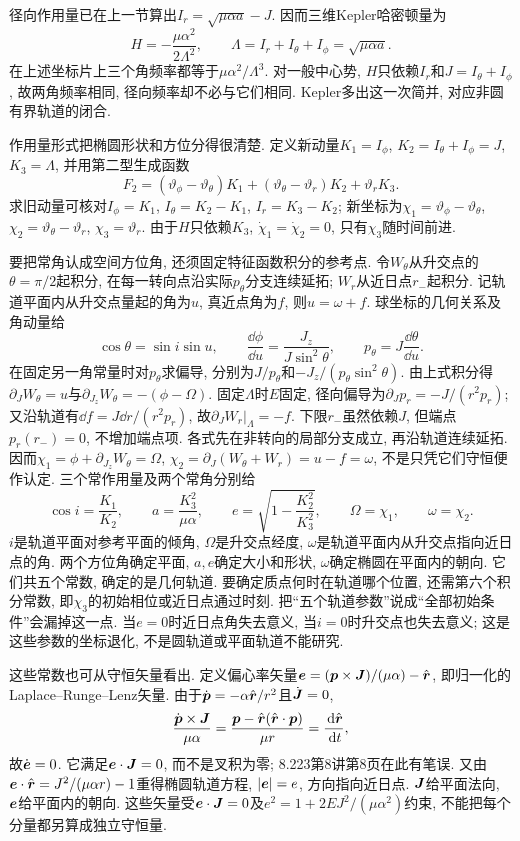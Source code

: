 径向作用量已在上一节算出$I_r=\sqrt{\mu\alpha a}-J$. 因而三维Kepler哈密顿量为
\[
H=-\frac{\mu\alpha^2}{2\Lambda^2},\qquad
\Lambda=I_r+I_\theta+I_\phi=\sqrt{\mu\alpha a}.
\]
在上述坐标片上三个角频率都等于$\mu\alpha^2/\Lambda^3$. 对一般中心势, $H$只依赖$I_r$和$J=I_\theta+I_\phi$, 故两角频率相同, 径向频率却不必与它们相同. Kepler多出这一次简并, 对应非圆有界轨道的闭合.

作用量形式把椭圆形状和方位分得很清楚. 定义新动量$K_1=I_\phi$, $K_2=I_\theta+I_\phi=J$, $K_3=\Lambda$, 并用第二型生成函数
\[
F_2=(\vartheta_\phi-\vartheta_\theta)K_1
+(\vartheta_\theta-\vartheta_r)K_2+\vartheta_rK_3.
\]
求旧动量可核对$I_\phi=K_1$, $I_\theta=K_2-K_1$, $I_r=K_3-K_2$; 新坐标为$\chi_1=\vartheta_\phi-\vartheta_\theta$, $\chi_2=\vartheta_\theta-\vartheta_r$, $\chi_3=\vartheta_r$. 由于$H$只依赖$K_3$, $\dot\chi_1=\dot\chi_2=0$, 只有$\chi_3$随时间前进.

要把常角认成空间方位角, 还须固定特征函数积分的参考点. 令$W_\theta$从升交点的$\theta=\pi/2$起积分, 在每一转向点沿实际$p_\theta$分支连续延拓; $W_r$从近日点$r_-$起积分. 记轨道平面内从升交点量起的角为$u$, 真近点角为$f$, 则$u=\omega+f$. 球坐标的几何关系及角动量给
\[
\cos\theta=\sin i\sin u,\qquad
\frac{\dd\phi}{\dd u}=\frac{J_z}{J\sin^2\theta},\qquad
p_\theta=J\frac{\dd\theta}{\dd u}.
\]
在固定另一角常量时对$p_\theta$求偏导, 分别为$J/p_\theta$和$-J_z/(p_\theta\sin^2\theta)$. 由上式积分得$\partial_JW_\theta=u$与$\partial_{J_z}W_\theta=-(\phi-\Omega)$. 固定$\Lambda$时$E$固定, 径向偏导为$\partial_Jp_r=-J/(r^2p_r)$; 又沿轨道有$\dd f=J\dd r/(r^2p_r)$, 故$\partial_JW_r|_\Lambda=-f$. 下限$r_-$虽然依赖$J$, 但端点$p_r(r_-)=0$, 不增加端点项. 各式先在非转向的局部分支成立, 再沿轨道连续延拓. 因而$\chi_1=\phi+\partial_{J_z}W_\theta=\Omega$, $\chi_2=\partial_J(W_\theta+W_r)=u-f=\omega$, 不是只凭它们守恒便作认定. 三个常作用量及两个常角分别给
\[
\cos i=\frac{K_1}{K_2},\qquad
a=\frac{K_3^2}{\mu\alpha},\qquad
e=\sqrt{1-\frac{K_2^2}{K_3^2}},\qquad
\Omega=\chi_1,\qquad \omega=\chi_2.
\]
$i$是轨道平面对参考平面的倾角, $\Omega$是升交点经度, $\omega$是轨道平面内从升交点指向近日点的角. 两个方位角确定平面, $a,e$确定大小和形状, $\omega$确定椭圆在平面内的朝向. 它们共五个常数, 确定的是几何轨道. 要确定质点何时在轨道哪个位置, 还需第六个积分常数, 即$\chi_3$的初始相位或近日点通过时刻. 把“五个轨道参数”说成“全部初始条件”会漏掉这一点. 当$e=0$时近日点角失去意义, 当$i=0$时升交点也失去意义; 这是这些参数的坐标退化, 不是圆轨道或平面轨道不能研究.

这些常数也可从守恒矢量看出. 定义偏心率矢量$\boldsymbol{e}=(\boldsymbol{p}\times\boldsymbol{J})/(\mu\alpha)-\hat{\boldsymbol{r}}$, 即归一化的Laplace--Runge--Lenz矢量. 由于$\dot{\boldsymbol{p}}=-\alpha\hat{\boldsymbol{r}}/r^2$且$\dot{\boldsymbol{J}}=0$,
\[
\frac{\dot{\boldsymbol{p}}\times\boldsymbol{J}}{\mu\alpha}
=\frac{\boldsymbol{p}-\hat{\boldsymbol{r}}(\hat{\boldsymbol{r}}\cdot\boldsymbol{p})}{\mu r}
=\frac{\,\mathrm d\hat{\boldsymbol{r}}}{\,\mathrm d t},
\]
故$\dot{\boldsymbol{e}}=0$. 它满足$\boldsymbol{e}\cdot\boldsymbol{J}=0$, 而不是叉积为零; 8.223第8讲第8页在此有笔误. 又由$\boldsymbol{e}\cdot\hat{\boldsymbol{r}}=J^2/(\mu\alpha r)-1$重得椭圆轨道方程, $|\boldsymbol{e}|=e$, 方向指向近日点. $\boldsymbol{J}$给平面法向, $\boldsymbol{e}$给平面内的朝向. 这些矢量受$\boldsymbol{e}\cdot\boldsymbol{J}=0$及$e^2=1+2EJ^2/(\mu\alpha^2)$约束, 不能把每个分量都另算成独立守恒量.
